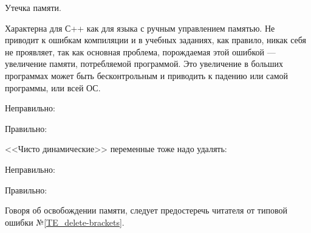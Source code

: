\begin{typerror}
	\label{TE_memory-leak}
	Утечка памяти.

	Характерна для С++ как для языка с ручным управлением памятью.
	Не приводит к ошибкам компиляции и в учебных заданиях, как правило, никак себя не проявляет,
	так как основная проблема, порождаемая этой ошибкой --- увеличение памяти, потребляемой программой.
	Это увеличение в больших программах может быть бесконтрольным и приводить к падению или самой программы, или всей ОС.

	Неправильно:

	Правильно:

	<<Чисто динамические>> переменные тоже надо удалять:

	Неправильно:

	Правильно:

	Говоря об освобождении памяти, следует предостеречь читателя от типовой ошибки №\ref{TE_delete-brackets}.

\end{typerror}
